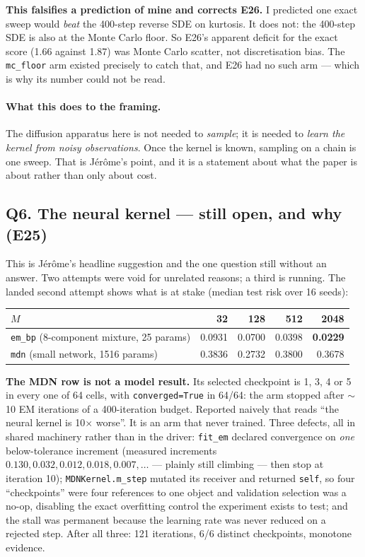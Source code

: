 \documentclass[10pt,a4paper]{article}
\newcommand{\nseq}{M}
\newcommand{\code}[1]{\texttt{\small #1}}
\newcommand{\st}[1]{\textbf{#1}}
\begin{document}
\st{This falsifies a prediction of mine and corrects E26.} I predicted one exact sweep would
\emph{beat} the 400-step reverse SDE on kurtosis. It does not: the 400-step SDE is also at the
Monte Carlo floor. So E26's apparent deficit for the exact score (1.66 against 1.87) was Monte
Carlo scatter, not discretisation bias. The \code{mc\_floor} arm existed precisely to catch
that, and E26 had no such arm --- which is why its number could not be read.

\paragraph{What this does to the framing.} The diffusion apparatus here is not needed to
\emph{sample}; it is needed to \emph{learn the kernel from noisy observations}. Once the kernel
is known, sampling on a chain is one sweep. That is Jérôme's point, and it is a statement about
what the paper is about rather than only about cost.

\subsection{Q6. The neural kernel --- still open, and why (E25)}

This is Jérôme's headline suggestion and the one question still without an answer. Two attempts
were void for unrelated reasons; a third is running. The landed second attempt shows what is at
stake (median test risk over 16 seeds):

\medskip
\noindent\begin{tabular}{@{}l rrrr@{}}
\toprule
$\nseq$ & 32 & 128 & 512 & 2048 \\
\midrule
\code{em\_bp} (8-component mixture, 25 params) & 0.0931 & 0.0700 & 0.0398 & \st{0.0229} \\
\code{mdn} (small network, 1516 params) & 0.3836 & 0.2732 & 0.3800 & 0.3678 \\
\bottomrule
\end{tabular}

\medskip
\st{The MDN row is not a model result.} Its selected checkpoint is 1, 3, 4 or 5 in every one of
64 cells, with \code{converged=True} in 64/64: the arm stopped after $\sim$10 EM iterations of a
400-iteration budget. Reported naively that reads ``the neural kernel is 10$\times$ worse''. It
is an arm that never trained. Three defects, all in shared machinery rather than in the driver:
\code{fit\_em} declared convergence on \emph{one} below-tolerance increment (measured increments
$0.130, 0.032, 0.012, 0.018, 0.007, \ldots$ --- plainly still climbing --- then stop at iteration
10); \code{MDNKernel.m\_step} mutated its receiver and returned \code{self}, so four
``checkpoints'' were four references to one object and validation selection was a no-op,
disabling the exact overfitting control the experiment exists to test; and the stall was
permanent because the learning rate was never reduced on a rejected step. After all three: 121
iterations, 6/6 distinct checkpoints, monotone evidence.
\end{document}
